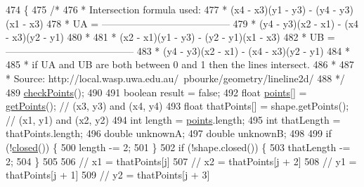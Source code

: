 \begin{DoxyCode}
474                                            \{
475         \textcolor{comment}{/*}
476 \textcolor{comment}{         * Intersection formula used:}
477 \textcolor{comment}{         *      (x4 - x3)(y1 - y3) - (y4 - y3)(x1 - x3)}
478 \textcolor{comment}{         * UA = ---------------------------------------}
479 \textcolor{comment}{         *      (y4 - y3)(x2 - x1) - (x4 - x3)(y2 - y1)}
480 \textcolor{comment}{         *      }
481 \textcolor{comment}{         *      (x2 - x1)(y1 - y3) - (y2 - y1)(x1 - x3)}
482 \textcolor{comment}{         * UB = ---------------------------------------}
483 \textcolor{comment}{         *      (y4 - y3)(x2 - x1) - (x4 - x3)(y2 - y1)}
484 \textcolor{comment}{         *      }
485 \textcolor{comment}{         * if UA and UB are both between 0 and 1 then the lines intersect.}
486 \textcolor{comment}{         * }
487 \textcolor{comment}{         * Source: http://local.wasp.uwa.edu.au/~pbourke/geometry/lineline2d/}
488 \textcolor{comment}{         */}
489         \mbox{\hyperlink{classorg_1_1newdawn_1_1slick_1_1geom_1_1_shape_a84293802d05e8666a441720bfc12745d}{checkPoints}}();
490 
491         \textcolor{keywordtype}{boolean} result = \textcolor{keyword}{false};
492         \textcolor{keywordtype}{float} \mbox{\hyperlink{classorg_1_1newdawn_1_1slick_1_1geom_1_1_shape_a8b4d4058734bbb3b96072e470b92aa37}{points}}[] = \mbox{\hyperlink{classorg_1_1newdawn_1_1slick_1_1geom_1_1_shape_aa2459b94ebcb915647bc487951fb15f9}{getPoints}}();           \textcolor{comment}{// (x3, y3)  and (x4, y4)}
493         \textcolor{keywordtype}{float} thatPoints[] = shape.getPoints(); \textcolor{comment}{// (x1, y1)  and (x2, y2)}
494         \textcolor{keywordtype}{int} length = \mbox{\hyperlink{classorg_1_1newdawn_1_1slick_1_1geom_1_1_shape_a8b4d4058734bbb3b96072e470b92aa37}{points}}.length;
495         \textcolor{keywordtype}{int} thatLength = thatPoints.length;
496         \textcolor{keywordtype}{double} unknownA;
497         \textcolor{keywordtype}{double} unknownB;
498         
499         \textcolor{keywordflow}{if} (!\mbox{\hyperlink{classorg_1_1newdawn_1_1slick_1_1geom_1_1_shape_a95d6725fbfa1ab9baff9bd721da82241}{closed}}()) \{
500             length -= 2;
501         \}
502         \textcolor{keywordflow}{if} (!shape.closed()) \{
503             thatLength -= 2;
504         \}
505         
506         \textcolor{comment}{// x1 = thatPoints[j]}
507         \textcolor{comment}{// x2 = thatPoints[j + 2]}
508         \textcolor{comment}{// y1 = thatPoints[j + 1]}
509         \textcolor{comment}{// y2 = thatPoints[j + 3]}

\end{DoxyCode}
